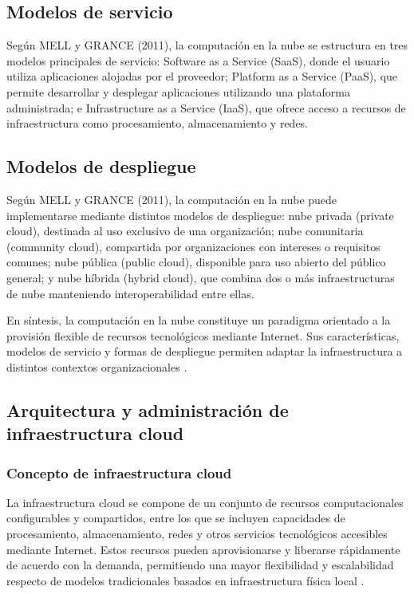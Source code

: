 \subsection{Modelos de servicio}

Según MELL y GRANCE (2011), la computación en la nube se estructura en tres modelos principales de servicio: Software as a Service (SaaS), donde el usuario utiliza aplicaciones alojadas por el proveedor; Platform as a Service (PaaS), que permite desarrollar y desplegar aplicaciones utilizando una plataforma administrada; e Infrastructure as a Service (IaaS), que ofrece acceso a recursos de infraestructura como procesamiento, almacenamiento y redes.

\subsection{Modelos de despliegue}

Según MELL y GRANCE (2011), la computación en la nube puede implementarse mediante distintos modelos de despliegue: nube privada (private cloud), destinada al uso exclusivo de una organización; nube comunitaria (community cloud), compartida por organizaciones con intereses o requisitos comunes; nube pública (public cloud), disponible para uso abierto del público general; y nube híbrida (hybrid cloud), que combina dos o más infraestructuras de nube manteniendo interoperabilidad entre ellas.

En síntesis, la computación en la nube constituye un paradigma orientado a la provisión flexible de recursos tecnológicos mediante Internet. Sus características, modelos de servicio y formas de despliegue permiten adaptar la infraestructura a distintos contextos organizacionales \parencite{Mell2011}.

\subsection{Arquitectura y administración de infraestructura cloud}

\subsubsection{Concepto de infraestructura cloud}

La infraestructura cloud se compone de un conjunto de recursos computacionales configurables y compartidos, entre los que se incluyen capacidades de procesamiento, almacenamiento, redes y otros servicios tecnológicos accesibles mediante Internet. Estos recursos pueden aprovisionarse y liberarse rápidamente de acuerdo con la demanda, permitiendo una mayor flexibilidad y escalabilidad respecto de modelos tradicionales basados en infraestructura física local \parencite{Mell2011}.

